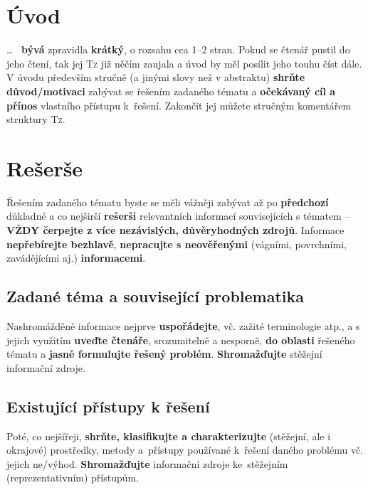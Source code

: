\documentclass[a4paper,11pt, twoside]{report}
\begin{document}
\section{Úvod}

\ldots 
~\textbf{bývá} zpravidla \textbf{krátký}, o rozsahu cca 1--2 stran.
Pokud se čtenář pustil do jeho čtení, tak jej \textsc{Tz} již něčím zaujala 
a úvod by měl posílit jeho touhu číst dále.
V úvodu především 
stručně (a jinými slovy než v abstraktu) 
\textbf{shrňte důvod/motivaci} zabývat se řešením zadaného tématu
a
\textbf{očekávaný cíl a přínos} vlastního přístupu k~řešení.
Zakončit jej můžete stručným komentářem struktury \textsc{Tz}.

\parbox{\textwidth}{
\centering

\scalebox{2.5}{
\faBook
}
\vspace{-8mm}
}

\section{Rešerše}
\label{sec:research}

Řešením zadaného tématu 
byste se měli vážněji zabývat 
až po \textbf{předchozí} důkladné a co nejširší \textbf{rešerši} relevantních informací 
souvisejících s tématem -- \textbf{VŽDY čerpejte z více nezávislých, důvěryhodných zdrojů}. 
Informace \textbf{nepřebírejte bezhlavě},
\textbf{nepracujte s 
neověřenými} (vágními, povrchními, zavádějícími aj.) \textbf{informacemi}.


\subsection{Zadané téma a související problematika}

Nashromážděné informace nejprve \textbf{uspořádejte}, vč. zažité terminologie atp.,
a s jejich využitím 
\textbf{uveďte čtenáře}, srozumitelně a nesporně, \textbf{do oblasti} řešeného tématu
a \textbf{jasně formulujte řešený problém}.
\textbf{Shromažďujte} stěžejní informační zdroje.

\subsection{Existující přístupy k řešení}


Poté, co nejšířeji,
\textbf{shrňte, klasifikujte a charakterizujte} (stěžejní, ale i okrajové) 
prostředky, metody a~přístupy používané k~řešení daného problému
vč. 
jejich ne/výhod.
\textbf{Shromažďujte} informační zdroje ke~stěžejním (reprezentativním) přístupům.
\end{document}
